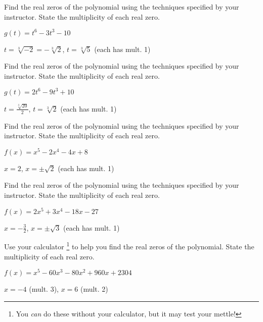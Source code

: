 \documentclass{ximera}
\begin{document}
\begin{problem}
Find the real zeros of the polynomial using the techniques specified by your instructor.  State the multiplicity of each real zero.

$g(t) = t^6-3t^3-10$

\begin{solution}
$t = \sqrt[3]{-2} = -\sqrt[3]{2}$, $t = \sqrt[3]{5}$ (each has mult. 1)
\end{solution}
\end{problem}

\begin{problem}
Find the real zeros of the polynomial using the techniques specified by your instructor.  State the multiplicity of each real zero.

$g(t) = 2t^6-9t^3+10$

\begin{solution}
$t =\frac{\sqrt[3]{20}}{2} $, $t = \sqrt[3]{2}$ (each has mult. 1)
\end{solution}

\end{problem}

\begin{problem}
Find the real zeros of the polynomial using the techniques specified by your instructor.  State the multiplicity of each real zero.

$f(x) = x^5-2x^4-4x+8$

\begin{solution}
$x = 2$, $x = \pm \sqrt{2}$ (each has mult. 1)
\end{solution}

\end{problem}

\begin{problem}\label{findrealzerosexerlast}
Find the real zeros of the polynomial using the techniques specified by your instructor.  State the multiplicity of each real zero.

$f(x) = 2x^5+3x^4-18x-27$ 

\begin{solution}
$x = -\frac{3}{2}$, $x = \pm \sqrt{3}$ (each has mult. 1)
\end{solution}

\end{problem}

\begin{problem}\label{realzeroswcalcfirst}
Use your calculator \footnote{You \textit{can} do these without your calculator, but it may test your mettle!} to help you find the real zeros of the polynomial.  State the multiplicity of each real zero.

$f(x) = x^{5} - 60x^{3} - 80x^{2} + 960x + 2304$

\begin{solution}
 $x = -4$ (mult. 3), $x = 6$ (mult. 2)
\end{solution}

\end{problem}
\end{document}
